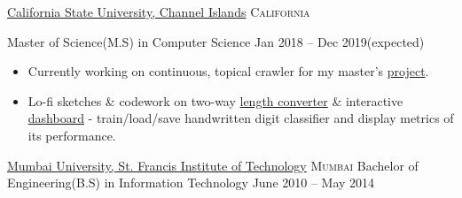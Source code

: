 \documentclass[11pt,a4paper]{article}
\begin{document}
\headedsection
  {\href{https://www.csuci.edu/}{California State University, Channel Islands}}
  {\textsc{California}} {%
  \headedsubsection
    {Master of Science(M.S) in Computer Science}
    {Jan 2018 -- Dec 2019(expected)}
    {
      \begin{itemize}
        \item Currently working on continuous, topical crawler for my master's \href{https://github.com/rihbyne/csuci-mscs-thesis-dist-web-crawler/blob/master/initial-writeup/initialwriteup.pdf}{project}.
        \item Lo-fi sketches \& codework on two-way \href{https://github.com/rihbyne/linear-length-converter}{length converter} \&  interactive \href{https://github.com/rihbyne/watch-ml-behave}{dashboard} - train/load/save handwritten digit classifier and display metrics of its performance.
      \end{itemize}
    }
  }

\headedsection
  {\href{http://www.mu.ac.in/}{Mumbai University, St. Francis Institute of Technology}}
  {\textsc{Mumbai}} {%
  \headedsubsection
    {Bachelor of Engineering(B.S) in Information Technology}
    {June 2010 -- May 2014}
    {}
}
\end{document}
